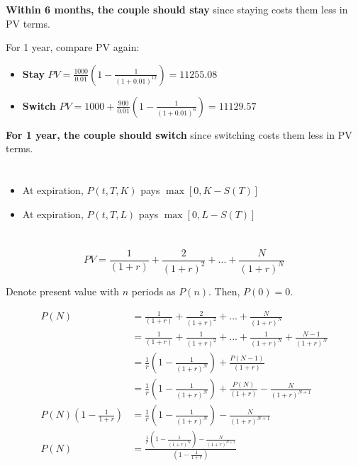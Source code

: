 \documentclass[11pt]{scrartcl}
\begin{document}
\textbf{Within 6 months, the couple should stay} since staying costs them less in PV terms.

For 1 year, compare PV again:

\begin{itemize}
\item \textbf{Stay} $PV = \frac{1000}{0.01} \left(1 - \frac{1}{(1+0.01)^12}\right) = 11255.08$
\item \textbf{Switch} $PV = 1000 + \frac{900}{0.01} \left(1 - \frac{1}{(1+0.01)^6} \right) = 11129.57$
\end{itemize}

\textbf{For 1 year, the couple should switch} since switching costs them less in PV terms.

\section{}

\begin{itemize}
\item At expiration, $P(t, T, K)$ pays $\max{[0, K-S(T)]}$
\item At expiration, $P(t, T, L)$ pays $\max{[0, L-S(T)]}$
\end{itemize}

\section{}

\subsection{}

\[PV = \frac{1}{(1+r)} + \frac{2}{(1+r)^2} + ... + \frac{N}{(1+r)^N}\]

Denote present value with $n$ periods as $P(n)$. Then, $P(0) = 0$.

\begin{align*}
P(N) &= \frac{1}{(1+r)} + \frac{2}{(1+r)^2} + ... + \frac{N}{(1+r)^N} \\
&= \frac{1}{(1+r)} + \frac{1}{(1+r)^2} + ... + \frac{1}{(1+r)^N} + \frac{N-1}{(1+r)^N} \\
&= \frac{1}{r}\left(1-\frac{1}{(1+r)^N}\right) + \frac{P(N-1)}{(1+r)} \\
&= \frac{1}{r}\left(1-\frac{1}{(1+r)^N}\right) + \frac{P(N)}{(1+r)} - \frac{N}{(1+r)^{N+1}} \\
P(N) \left(1 - \frac{1}{1+r}\right) &= \frac{1}{r}\left(1-\frac{1}{(1+r)^N}\right) - \frac{N}{(1+r)^{N+1}} \\
P(N) &= \frac{\frac{1}{r}\left(1-\frac{1}{(1+r)^N}\right) - \frac{N}{(1+r)^{N+1}}}{\left(1 - \frac{1}{1+r}\right)}
\end{align*}
\end{document}
